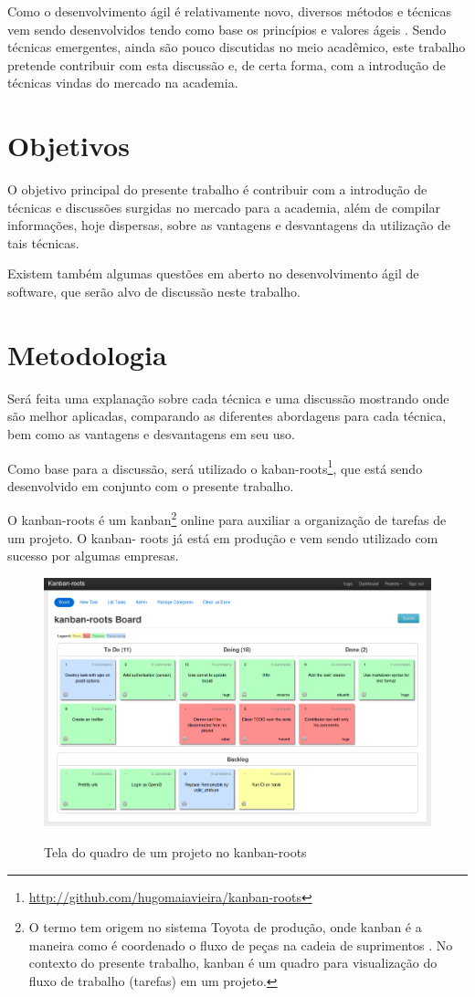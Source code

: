 Como o desenvolvimento ágil é relativamente novo, diversos métodos e técnicas
vem sendo desenvolvidos tendo como base os princípios e valores ágeis
\cite{BDDRodrigo}. Sendo técnicas emergentes, ainda são pouco discutidas no meio
acadêmico, este trabalho pretende contribuir com esta discussão e, de certa
forma, com a introdução de técnicas vindas do mercado na academia.



\section{Objetivos}

O objetivo principal do presente trabalho é contribuir com a introdução de
técnicas e discussões surgidas no mercado para a academia, além de compilar
informações, hoje dispersas, sobre as vantagens e desvantagens da utilização de
tais técnicas.

Existem também algumas questões em aberto no desenvolvimento ágil de software,
que serão alvo de discussão neste trabalho.

\section{Metodologia}

Será feita uma explanação sobre cada técnica e uma discussão mostrando onde são
melhor aplicadas, comparando as diferentes abordagens para cada técnica, bem
como as vantagens e desvantagens em seu uso.

Como base para a discussão, será utilizado o
kaban-roots\footnote{\href{http://github.com/hugomaiavieira/kanban-roots}
{http://github.com/hugomaiavieira/kanban-roots}}, que está sendo desenvolvido em
conjunto com o presente trabalho.

O kanban-roots é um kanban\footnote{O termo tem origem no sistema Toyota de
produção, onde kanban é a maneira como é coordenado o fluxo de peças na cadeia
de suprimentos  \cite{AMaquinaQueMudouOMundo}. No contexto do presente trabalho,
kanban é um quadro para visualização do fluxo de trabalho (tarefas) em um
projeto.} online para auxiliar a organização de tarefas de um projeto. O kanban-
roots já está em produção e vem sendo utilizado com sucesso por algumas
empresas.

\begin{figure}[h]
    \center
    \caption{Tela do quadro de um projeto no kanban-roots}
    \includegraphics[scale=0.45]{images/kanban-roots}
    \label{tela_kaban_roots}
\end{figure}